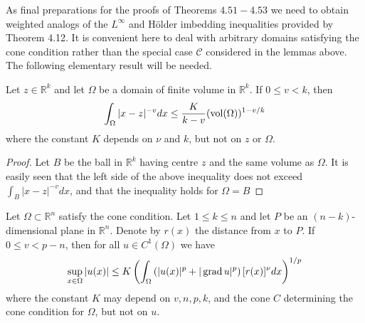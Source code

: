As final preparations for the proofs of Theorems $4.51-4.53$ we need to obtain weighted analogs of the $L^{\infty}$ and Hölder imbedding inequalities provided by Theorem 4.12. It is convenient here to deal with arbitrary domains satisfying the cone condition rather than the special case $\mathcal{C}$ considered in the lemmas above. The following elementary result will be needed.


\begin{lemma}
  Let $z \in \mathbb{R}^k$ and let $\Omega$ be a domain of finite volume in $\mathbb{R}^k$. If $0 \leq v<k$, then
  \[
  \int_{\Omega}|x-z|^{-v} d x \leq \frac{K}{k-v}(\operatorname{vol}(\Omega))^{1-v / k}
  \]
  where the constant $K$ depends on $\nu$ and $k$, but not on $z$ or $\Omega$.
\end{lemma}

\begin{proof}
  Let $B$ be the ball in $\mathbb{R}^k$ having centre $z$ and the same volume as $\Omega$. It is easily seen that the left side of the above inequality does not exceed $\int_B|x-z|^{-v} d x$, and that the inequality holds for $\Omega=B$
\end{proof}


\begin{lemma}
  Let $\Omega \subset \mathbb{R}^n$ satisfy the cone condition. Let $1 \leq k \leq n$ and let $P$ be an $(n-k)$-dimensional plane in $\mathbb{R}^n$. Denote by $r(x)$ the distance from $x$ to $P$. If $0 \leq v<p-n$, then for all $u \in C^1(\Omega)$ we have
  \[
  \sup _{x \in \Omega}|u(x)| \leq K\left(\int_{\Omega}\left(|u(x)|^p+|\operatorname{grad} u|^p\right)[r(x)]^\nu d x\right)^{1 / p}
  \]
  where the constant $K$ may depend on $v, n, p, k$, and the cone $C$ determining the cone condition for $\Omega$, but not on $u$.
\end{lemma}


